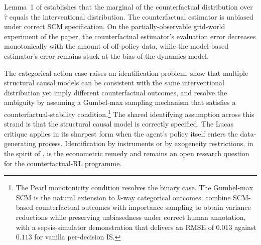 Lemma~1 of \citet{Buesing2019} establishes that the marginal of the
counterfactual distribution over $\hat\tau$ equals the interventional
distribution. The counterfactual estimator is unbiased under correct SCM
specification. On the partially-observable grid-world experiment of the
paper, the counterfactual estimator's evaluation error decreases
monotonically with the amount of off-policy data, while the model-based
estimator's error remains stuck at the bias of the dynamics model.

The categorical-action case raises an identification problem.
\citet{Oberst2019} show that multiple structural causal models can be
consistent with the same interventional distribution yet imply different
counterfactual outcomes, and resolve the ambiguity by assuming a
Gumbel-max sampling mechanism that satisfies a counterfactual-stability
condition.\footnote{The Pearl monotonicity condition resolves the binary
case. The Gumbel-max SCM is the natural extension to $k$-way categorical
outcomes. \citet{TangWiens2023} combine SCM-based counterfactual outcomes
with importance sampling to obtain variance reductions while preserving
unbiasedness under correct human annotation, with a sepsis-simulator
demonstration that delivers an RMSE of $0.013$ against $0.113$ for vanilla
per-decision IS.} The shared identifying assumption across this strand is
that the structural causal model is correctly specified. The Lucas
critique applies in its sharpest form when the agent's policy itself
enters the data-generating process. Identification by instruments or by
exogeneity restrictions, in the spirit of \citet{Chernozhukov2018}, is the
econometric remedy and remains an open research question for the
counterfactual-RL programme.
